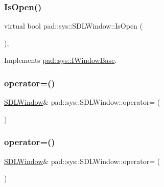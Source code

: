 \subsubsection{\texorpdfstring{Is\+Open()}{IsOpen()}}
{\footnotesize\ttfamily virtual bool pad\+::sys\+::\+S\+D\+L\+Window\+::\+Is\+Open (\begin{DoxyParamCaption}{ }\end{DoxyParamCaption})\hspace{0.3cm}{\ttfamily [inline]}, {\ttfamily [virtual]}}



Implements \mbox{\hyperlink{classpad_1_1sys_1_1_i_window_base_a07aae1254b0d8139e912584029d785ea}{pad\+::sys\+::\+I\+Window\+Base}}.

\mbox{\label{classpad_1_1sys_1_1_s_d_l_window_a16ec17984ff879debe4ddce2784ec858}} 
\subsubsection{\texorpdfstring{operator=()}{operator=()}\hspace{0.1cm}{\footnotesize\ttfamily [1/2]}}
{\footnotesize\ttfamily \mbox{\hyperlink{classpad_1_1sys_1_1_s_d_l_window}{S\+D\+L\+Window}}\& pad\+::sys\+::\+S\+D\+L\+Window\+::operator= (\begin{DoxyParamCaption}\item[{const \mbox{\hyperlink{classpad_1_1sys_1_1_s_d_l_window}{S\+D\+L\+Window}} \&}]{ }\end{DoxyParamCaption})\hspace{0.3cm}{\ttfamily [delete]}}

\mbox{\label{classpad_1_1sys_1_1_s_d_l_window_addbf3af44214f1bc0ece277fedac35cd}} 
\subsubsection{\texorpdfstring{operator=()}{operator=()}\hspace{0.1cm}{\footnotesize\ttfamily [2/2]}}
{\footnotesize\ttfamily \mbox{\hyperlink{classpad_1_1sys_1_1_s_d_l_window}{S\+D\+L\+Window}}\& pad\+::sys\+::\+S\+D\+L\+Window\+::operator= (\begin{DoxyParamCaption}\item[{\mbox{\hyperlink{classpad_1_1sys_1_1_s_d_l_window}{S\+D\+L\+Window}} \&\&}]{ }\end{DoxyParamCaption})\hspace{0.3cm}{\ttfamily [delete]}}

